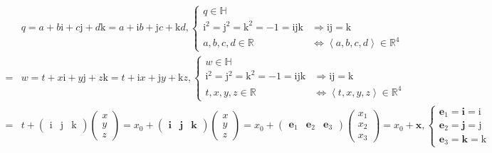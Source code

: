 \documentclass[
]{book}
\theoremstyle{definition}
\theoremstyle{definition}
\theoremstyle{definition}
\theoremstyle{definition}
\theoremstyle{remark}
\begin{document}
\[
\begin{aligned}
 & q=a+b\mathrm{i}+c\mathrm{j}+d\mathrm{k}=a+\mathrm{i}b+\mathrm{j}c+\mathrm{k}d,\begin{cases}
q\in\mathbb{H}\\
\mathrm{i}^{2}=\mathrm{j}^{2}=\mathrm{k}^{2}=-1=\mathrm{i}\mathrm{j}\mathrm{k} & \Rightarrow\mathrm{i}\mathrm{j}=\mathrm{k}\\
a,b,c,d\in\mathbb{R} & \Leftrightarrow\left\langle a,b,c,d\right\rangle \in\mathbb{R}^{4}
\end{cases}\\
= & w=t+x\mathrm{i}+y\mathrm{j}+z\mathrm{k}=t+\mathrm{i}x+\mathrm{j}y+\mathrm{k}z,\begin{cases}
w\in\mathbb{H}\\
\mathrm{i}^{2}=\mathrm{j}^{2}=\mathrm{k}^{2}=-1=\mathrm{i}\mathrm{j}\mathrm{k} & \Rightarrow\mathrm{i}\mathrm{j}=\mathrm{k}\\
t,x,y,z\in\mathbb{R} & \Leftrightarrow\left\langle t,x,y,z\right\rangle \in\mathbb{R}^{4}
\end{cases}\\
= & t+\begin{pmatrix}\mathrm{i} & \mathrm{j} & \mathrm{k}\end{pmatrix}\begin{pmatrix}x\\
y\\
z
\end{pmatrix}=x_{{\scriptscriptstyle 0}}+\begin{pmatrix}\boldsymbol{i} & \boldsymbol{j} & \boldsymbol{k}\end{pmatrix}\begin{pmatrix}x\\
y\\
z
\end{pmatrix}=x_{{\scriptscriptstyle 0}}+\begin{pmatrix}\boldsymbol{e}_{{\scriptscriptstyle 1}} & \boldsymbol{e}_{{\scriptscriptstyle 2}} & \boldsymbol{e}_{{\scriptscriptstyle 3}}\end{pmatrix}\begin{pmatrix}x_{{\scriptscriptstyle 1}}\\
x_{{\scriptscriptstyle 2}}\\
x_{{\scriptscriptstyle 3}}
\end{pmatrix}=x_{{\scriptscriptstyle 0}}+\boldsymbol{x},\begin{cases}
\boldsymbol{e}_{{\scriptscriptstyle 1}}=\boldsymbol{i}=\mathrm{i}\\
\boldsymbol{e}_{{\scriptscriptstyle 2}}=\boldsymbol{j}=\mathrm{j}\\
\boldsymbol{e}_{{\scriptscriptstyle 3}}=\boldsymbol{k}=\mathrm{k}
\end{cases}
\end{aligned}
\]
\end{document}
